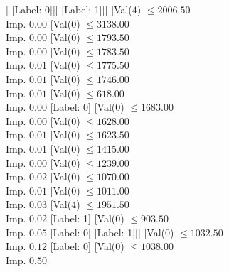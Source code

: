 \documentclass[margin=10pt]{standalone}
\begin{document}
\begin{forest}
	[Val($0$) $ \leq 3166.00$ \\ Imp. $0.00$
		[Val($0$) $ \leq 3151.00$ \\ Imp. $0.01$
			[Val($0$) $ \leq 615.00$ \\ Imp. $0.00$
				[Val($4$) $ \leq 1918.50$ \\ Imp. $0.04$
					[Label: 1]
					[Val($0$) $ \leq 527.50$ \\ Imp. $0.05$
						[Val($0$) $ \leq 503.50$ \\ Imp. $0.17$
							[Label: 1]
							[Val($0$) $ \leq 514.50$ \\ Imp. $0.11$
								[Val($0$) $ \leq 512.00$ \\ Imp. $0.50$
									[Label: 0]
									[Label: 1]]
								[Label: 0]]]
						[Label: 1]]]
				[Val($4$) $ \leq 2006.50$ \\ Imp. $0.00$
					[Val($0$) $ \leq 3138.00$ \\ Imp. $0.00$
						[Val($0$) $ \leq 1793.50$ \\ Imp. $0.00$
							[Val($0$) $ \leq 1783.50$ \\ Imp. $0.01$
								[Val($0$) $ \leq 1775.50$ \\ Imp. $0.01$
									[Val($0$) $ \leq 1746.00$ \\ Imp. $0.01$
										[Val($0$) $ \leq 618.00$ \\ Imp. $0.00$
											[Label: 0]
											[Val($0$) $ \leq 1683.00$ \\ Imp. $0.00$
												[Val($0$) $ \leq 1628.00$ \\ Imp. $0.01$
													[Val($0$) $ \leq 1623.50$ \\ Imp. $0.01$
														[Val($0$) $ \leq 1415.00$ \\ Imp. $0.00$
															[Val($0$) $ \leq 1239.00$ \\ Imp. $0.02$
																[Val($0$) $ \leq 1070.00$ \\ Imp. $0.01$
																	[Val($0$) $ \leq 1011.00$ \\ Imp. $0.03$
																		[Val($4$) $ \leq 1951.50$ \\ Imp. $0.02$
																			[Label: 1]
																			[Val($0$) $ \leq 903.50$ \\ Imp. $0.05$
																				[Label: 0]
																				[Label: 1]]]
																		[Val($0$) $ \leq 1032.50$ \\ Imp. $0.12$
																			[Label: 0]
																			[Val($0$) $ \leq 1038.00$ \\ Imp. $0.50$

\end{forest}
\end{document}
